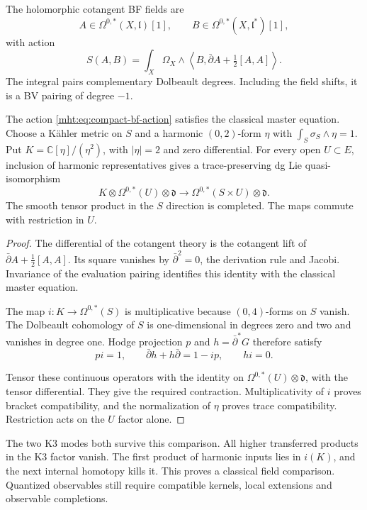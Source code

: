 The holomorphic cotangent BF fields are
\[
 A\in\Omega^{0,*}(X,\mathfrak l)[1],\qquad
 B\in\Omega^{0,*}(X,\mathfrak l^*)[1],
\]
with action
\begin{equation}\label{mht:eq:compact-bf-action}
 S(A,B)=\int_X\Omega_X\wedge
       \left\langle B,\bar\partial A+\tfrac12[A,A]\right\rangle.
\end{equation}
The integral pairs complementary Dolbeault degrees. Including the
field shifts, it is a BV pairing of degree $-1$.

\begin{proposition}\label{mht:prop:compact-bf}
The action \eqref{mht:eq:compact-bf-action} satisfies the classical
master equation. Choose a K\"ahler metric on $S$ and a harmonic
$(0,2)$-form $\eta$ with
$\int_S\sigma_S\wedge\eta=1$. Put
$K=\mathbb C[\eta]/(\eta^2)$, with $|\eta|=2$ and zero differential.
For every open $U\subset E$, inclusion of harmonic representatives gives
a trace-preserving dg Lie quasi-isomorphism
\[
 K\otimes\Omega^{0,*}(U)\otimes\mathfrak d
 \longrightarrow \Omega^{0,*}(S\times U)\otimes\mathfrak d.
\]
The smooth tensor product in the $S$ direction is completed.
The maps commute with restriction in $U$.
\end{proposition}

\begin{proof}
The differential of the cotangent theory is the cotangent lift of
$\bar\partial A+\tfrac12[A,A]$. Its square vanishes by
$\bar\partial^2=0$, the derivation rule and Jacobi. Invariance of the
evaluation pairing identifies this identity with the classical master
equation.

The map $i:K\to\Omega^{0,*}(S)$ is multiplicative because
$(0,4)$-forms on $S$ vanish. The Dolbeault cohomology of $S$ is
one-dimensional in degrees zero and two and vanishes in degree one.
Hodge projection $p$ and $h=\bar\partial^*G$ therefore satisfy
\[
 pi=1,\qquad \bar\partial h+h\bar\partial=1-ip,\qquad hi=0.
\]

Tensor these continuous operators with the identity on
$\Omega^{0,*}(U)\otimes\mathfrak d$, with the tensor differential.
They give the required contraction. Multiplicativity of $i$ proves
bracket compatibility, and the normalization of $\eta$ proves trace
compatibility. Restriction acts on the $U$ factor alone.
\end{proof}

The two K3 modes both survive this comparison. All higher
transferred products in the K3 factor vanish. The first product of
harmonic inputs lies in $i(K)$, and the next internal homotopy kills it.
This proves a classical field comparison. Quantized observables still
require compatible kernels, local extensions and observable
completions.

